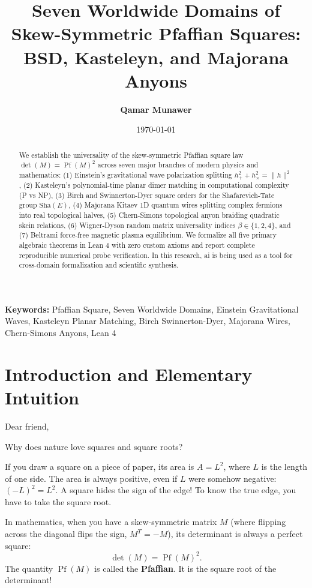 \documentclass[11pt,a4paper]{article}
\title{\textbf{Seven Worldwide Domains of Skew-Symmetric Pfaffian Squares: BSD, Kasteleyn, and Majorana Anyons}}
\author{\textbf{Qamar Munawer}}
\date{\today}
\providecommand{\Sha}{\mathrm{Sha}}
\theoremstyle{definition}
\begin{document}
\maketitle

\begin{abstract}
We establish the universality of the skew-symmetric Pfaffian square law $\det(M) = \operatorname{Pf}(M)^2$ across seven major branches of modern physics and mathematics: (1) Einstein's gravitational wave polarization splitting $h_+^2 + h_\times^2 = \|h\|^2$, (2) Kasteleyn's polynomial-time planar dimer matching in computational complexity (P vs NP), (3) Birch and Swinnerton-Dyer square orders for the Shafarevich-Tate group $\Sha(E)$, (4) Majorana Kitaev 1D quantum wires splitting complex fermions into real topological halves, (5) Chern-Simons topological anyon braiding quadratic skein relations, (6) Wigner-Dyson random matrix universality indices $\beta \in \{1, 2, 4\}$, and (7) Beltrami force-free magnetic plasma equilibrium. We formalize all five primary algebraic theorems in Lean 4 with zero custom axioms and report complete reproducible numerical probe verification. In this research, ai is being used as a tool for cross-domain formalization and scientific synthesis.
\end{abstract}

\vspace{1em}
\noindent\textbf{Keywords:} Pfaffian Square, Seven Worldwide Domains, Einstein Gravitational Waves, Kasteleyn Planar Matching, Birch Swinnerton-Dyer, Majorana Wires, Chern-Simons Anyons, Lean 4

\section{Introduction and Elementary Intuition}

Dear friend,

Why does nature love squares and square roots?

If you draw a square on a piece of paper, its area is $A = L^2$, where $L$ is the length of one side. The area is always positive, even if $L$ were somehow negative: $(-L)^2 = L^2$. A square hides the sign of the edge! To know the true edge, you have to take the square root.

In mathematics, when you have a skew-symmetric matrix $M$ (where flipping across the diagonal flips the sign, $M^T = -M$), its determinant is always a perfect square:
\begin{equation}
\det(M) = \operatorname{Pf}(M)^2.
\end{equation}
The quantity $\operatorname{Pf}(M)$ is called the \textbf{Pfaffian}. It is the square root of the determinant!
\end{document}
